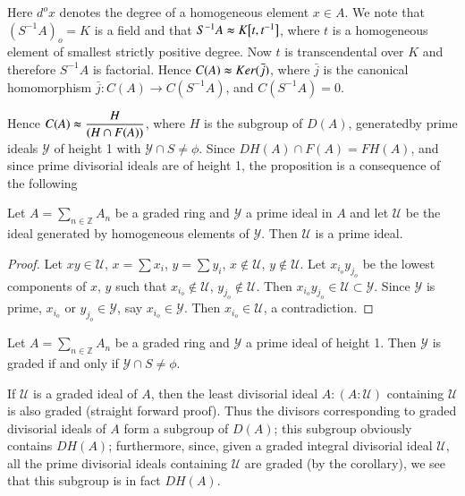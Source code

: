   \noindent
  Here $d^o x$ denotes the degree of a homogeneous element $x \in A$. We
  note that $(S^{-1} A)_o = K$ is a field and that $S^{-1} A
  \thickapprox K \big [t, t^{-1 } \big ]$, where $t$ is a homogeneous
  element of smallest strictly positive degree. Now $t$ is
  transcendental over $K$ and therefore $S^{-1}A$ is factorial. Hence
  $C(A) \thickapprox Ker (\bar{j})$, where $\bar{j}$ is the canonical
  homomorphism $\bar{j} : C(A) \rightarrow C(S^{-1} A)$, and
  $C(S^{-1}A) = 0$. 
  
  Hence $C(A) \thickapprox \dfrac{H}{(H \cap F(A))}$, where $H$ is the
  subgroup of $D(A)$, generated\pageoriginale by prime ideals
  $\mathscr{Y}$ of 
  height 1 with $\mathscr{Y} \cap S \neq \phi$. Since $DH(A) \cap
  F(A) = FH(A)$, and since prime divisorial ideals are of height 1,
  the proposition is a consequence of the following 


\setcounter{lemma}{1}
  \begin{lemma} %
Let $A = \sum\limits_{n \in \mathbb{Z}}A_n$ be a graded ring and
  $\mathscr{Y}$ a prime ideal in $A$ and let $\mathscr{U}$ be the ideal
  generated by homogeneous elements of $\mathscr{Y}$. Then $\mathscr{U}$ is
  a prime ideal. 
  \end{lemma}  
  
  \begin{proof} 
Let $x y \in \mathscr{U}$, $x = \sum x_i$, $y = \sum y_i$, $x \notin
\mathscr{U}$, $y 
\notin \mathscr{U}$. Let $x_{i_o} y_{j_o}$ be the lowest components of $x$,
$y$ such that $x_{i_o} \notin \mathscr{U}$, $y_{j_o} \notin \mathscr{U}$. Then
$x_{i_o} y_{j_o} \in \mathscr{U} \subset \mathscr{Y}$. Since $\mathscr{Y}$
is prime, $x_{i_o}$ or $y_{j_o} \in \mathscr{Y}$, say $x_{i_o} \in
\mathscr{Y}$. Then $x_{i_o} \in \mathscr{U}$, a contradiction. 
\end{proof}  

\begin{coro*} %
Let $A = \sum\limits_{n \in \mathbb{Z}} A_n$ be a graded ring and
$\mathscr{Y}$ a prime ideal of height 1. Then $\mathscr{Y}$ is
graded if and only if $\mathscr{Y} \cap S \neq \phi$. 
\end{coro*}  
  
\begin{remark*} %
If $\mathscr{U}$ is a graded ideal of $A$, then the least divisorial
ideal $A : (A : \mathscr{U})$ containing $\mathscr{U}$ is also graded
(straight forward proof). 
Thus the divisors corresponding to graded divisorial ideals of $A$
form a subgroup of $D(A)$; this subgroup obviously contains $DH(A)$;
furthermore, since, given a graded integral divisorial ideal
$\mathscr{U}$, all the prime divisorial ideals containing
$\mathscr{U}$ are graded (by the corollary), we see that this subgroup
is in fact $DH(A)$. 
\end{remark*}

